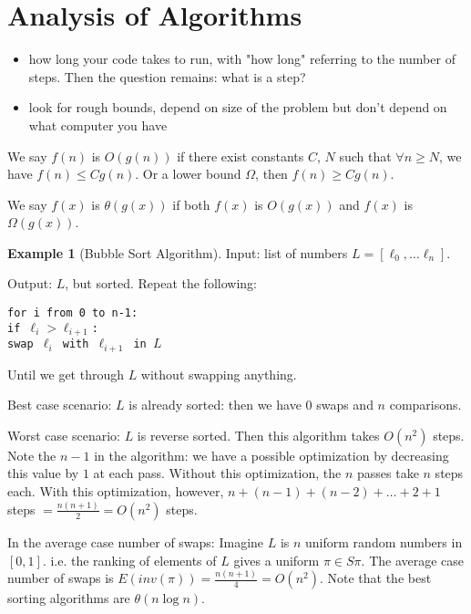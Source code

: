 \documentclass[12pt,letterpaper]{article}
\theoremstyle{definition}
\newtheorem{example}{Example}[section]
\begin{document}
\section{Analysis of Algorithms}

\begin{itemize}
	\item how long your code takes to run, with "how long" referring to the number of steps. Then the question remains: what is a step?
	\item look for rough bounds, depend on size of the problem but don't depend on what computer you have
\end{itemize}

We say $f(n)$ is $O(g(n))$ if there exist constants $C$, $N$ such that $\forall n \geq N$, we have $f(n) \leq Cg(n)$. Or a lower bound $\Omega$, then $f(n) \geq Cg(n)$. 

We say $f(x)$ is $\theta(g(x))$ if both $f(x)$ is $O(g(x))$ and $f(x)$ is $\Omega(g(x))$. 

\begin{example}[Bubble Sort Algorithm]
	Input: list of numbers $L = [\ell_0, \ldots \ell_n]$. 
	
	Output: $L$, but sorted.
	Repeat the following: 
	
	\noindent\texttt{for i from 0 to n-1:}\\
	\hspace*{4ex}\texttt{if $\ell_i > \ell_{i+1}$:}\\
	\hspace*{8ex}\texttt{swap $\ell_i$ with $\ell_{i+1}$ in $L$}
	
	Until we get through $L$ without swapping anything. 
	
	Best case scenario: $L$ is already sorted: then we have 0 swaps and $n$ comparisons. 
	
	Worst case scenario: $L$ is reverse sorted. Then this algorithm takes $O(n^2)$ steps. Note the $n-1$ in the algorithm: we have a possible optimization by decreasing this value by $1$ at each pass. Without this optimization, the $n$ passes take $n$ steps each. With this optimization, however, $n + (n-1) + (n-2) + \ldots + 2 + 1$ steps $= \frac{n(n+1)}{2} = O(n^2)$ steps. 
	
	In the average case number of swaps: 
	Imagine $L$ is $n$ uniform random numbers in $[0,1]$. i.e. the ranking of elements of $L$ gives a uniform $\pi \in S\pi$. The average case number of swaps is $E(inv(\pi)) = \frac{n(n+1)}{4} = O(n^2)$. Note that the best sorting algorithms are $\theta(n\log n)$. 
\end{example}
\end{document}
